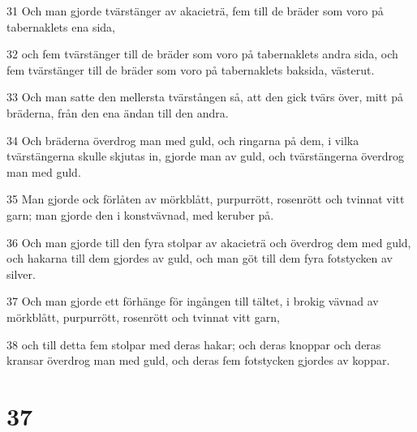 \par 31 Och man gjorde tvärstänger av akacieträ, fem till de bräder som voro på tabernaklets ena sida,
\par 32 och fem tvärstänger till de bräder som voro på tabernaklets andra sida, och fem tvärstänger till de bräder som voro på tabernaklets baksida, västerut.
\par 33 Och man satte den mellersta tvärstången så, att den gick tvärs över, mitt på bräderna, från den ena ändan till den andra.
\par 34 Och bräderna överdrog man med guld, och ringarna på dem, i vilka tvärstängerna skulle skjutas in, gjorde man av guld, och tvärstängerna överdrog man med guld.
\par 35 Man gjorde ock förlåten av mörkblått, purpurrött, rosenrött och tvinnat vitt garn; man gjorde den i konstvävnad, med keruber på.
\par 36 Och man gjorde till den fyra stolpar av akacieträ och överdrog dem med guld, och hakarna till dem gjordes av guld, och man göt till dem fyra fotstycken av silver.
\par 37 Och man gjorde ett förhänge för ingången till tältet, i brokig vävnad av mörkblått, purpurrött, rosenrött och tvinnat vitt garn,
\par 38 och till detta fem stolpar med deras hakar; och deras knoppar och deras kransar överdrog man med guld, och deras fem fotstycken gjordes av koppar.

\chapter{37}

